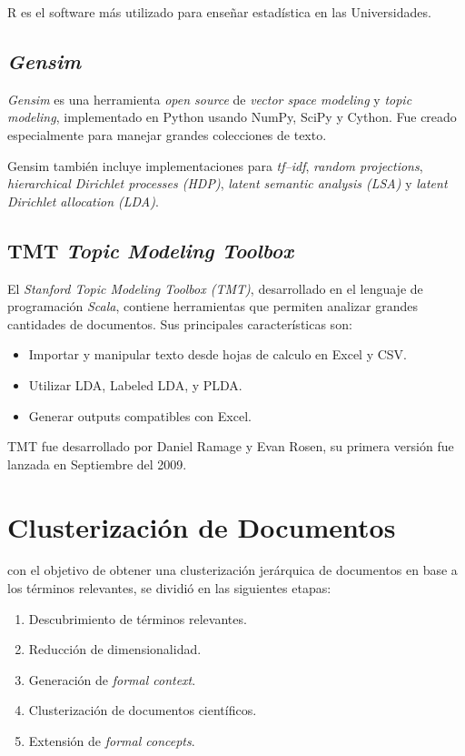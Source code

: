 \documentclass[12pt,oneside,letterpaper]{book}
\newcommand{\eng}[1]{\textit{#1}\xspace}			%
\newcommand{\abr}[1]{\textsc{#1}\xspace}           %
\theoremstyle{definition}
\begin{document}
R es el software más utilizado para enseñar estadística en las Universidades.

\subsection{\eng{Gensim}}
\label{sub:gensim}
\eng{Gensim} es una herramienta \eng{open source} de \eng{vector space modeling} y \eng{topic modeling}, implementado en Python usando NumPy, SciPy y Cython. Fue creado especialmente para manejar grandes colecciones de texto.

Gensim también incluye implementaciones para \eng{tf–idf}, \eng{random projections}, \eng{hierarchical Dirichlet processes (\abr{HDP})}, \eng{latent semantic analysis (\abr{LSA})} y \eng{latent Dirichlet allocation (\abr{LDA})}.

\subsection{\abr{TMT} \eng{Topic Modeling Toolbox}}
\label{sub:tmt}
El \eng{Stanford Topic Modeling Toolbox (\eng{TMT})}, desarrollado en el lenguaje de programación \eng{Scala}, contiene herramientas que permiten analizar grandes cantidades de documentos. Sus principales características son:

\begin{itemize}
	\item Importar y manipular texto desde hojas de calculo en Excel y CSV.
	\item Utilizar LDA, Labeled LDA, y PLDA.
	\item Generar outputs compatibles con Excel.
\end{itemize}

\abr{TMT} fue desarrollado por Daniel Ramage y Evan Rosen, su primera versión fue lanzada en Septiembre del 2009.

\section{Clusterización de Documentos}
\label{sec:clusterizacion_de_documentos}
con el objetivo de obtener una clusterización jerárquica de documentos en base a los términos relevantes, se dividió en las siguientes etapas:

\begin{enumerate}
	\item Descubrimiento de términos relevantes.
	\item Reducción de dimensionalidad.
	\item Generación de \eng{formal context}.
	\item Clusterización de documentos científicos.
	\item Extensión de \eng{formal concepts}.
\end{enumerate} 
\end{document}

